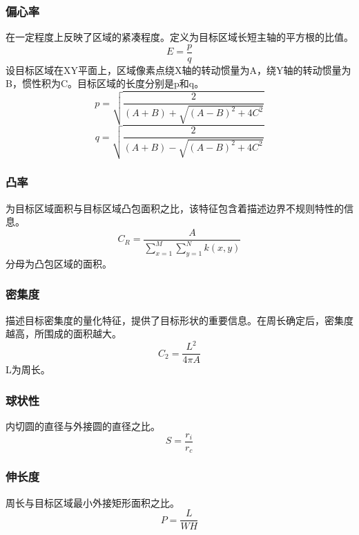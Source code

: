 \subsubsection{偏心率}
在一定程度上反映了区域的紧凑程度。定义为目标区域长短主轴的平方根的比值。
    \begin{displaymath}
    E=\frac{p}{q}
    \end{displaymath}
    设目标区域在XY平面上，区域像素点绕X轴的转动惯量为A，绕Y轴的转动惯量为B，惯性积为C。目标区域的长度分别是p和q。
    \begin{displaymath}
    p=\sqrt{\frac{2}{(A+B)+\sqrt{(A-B)^{2}+4C^{2}}}}
    \end{displaymath}
    \begin{displaymath}
    q=\sqrt{\frac{2}{(A+B)-\sqrt{(A-B)^{2}+4C^{2}}}}
    \end{displaymath}
    
\subsubsection{凸率}
为目标区域面积与目标区域凸包面积之比，该特征包含着描述边界不规则特性的信息。
    \begin{displaymath}
    C_{R}=\frac{A}{\sum_{x=1}^{M}\sum_{y=1}^{N}k(x,y)}
    \end{displaymath}
    分母为凸包区域的面积。
    
\subsubsection{密集度}
描述目标密集度的量化特征，提供了目标形状的重要信息。在周长确定后，密集度越高，所围成的面积越大。
    \begin{displaymath}
    C_{2}=\frac{L^{2}}{4\pi A}
    \end{displaymath}
    L为周长。
    
\subsubsection{球状性}
内切圆的直径与外接圆的直径之比。
    \begin{displaymath}
    S=\frac{r_{i}}{r_{c}}
    \end{displaymath}
    
\subsubsection{伸长度}
周长与目标区域最小外接矩形面积之比。
    \begin{displaymath}
    P=\frac{L}{WH}
    \end{displaymath}

